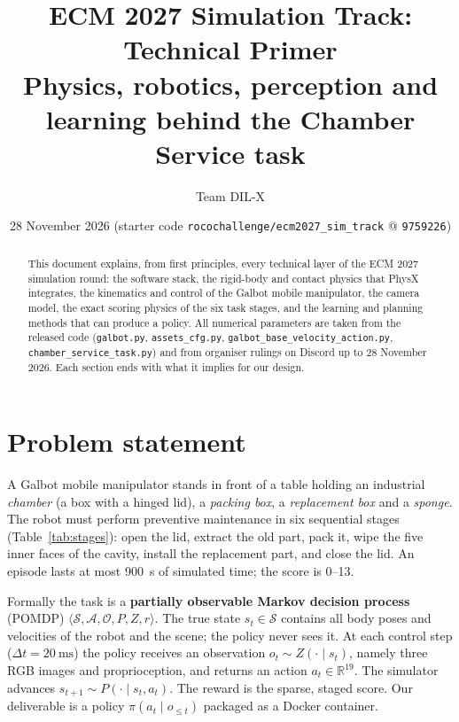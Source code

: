\documentclass[10pt,a4paper]{article}
\title{\textbf{ECM 2027 Simulation Track: Technical Primer}\\[2pt]
\large Physics, robotics, perception and learning behind the Chamber Service task}
\author{Team DIL-X}
\date{28 November 2026 \quad(starter code \texttt{rocochallenge/ecm2027\_sim\_track} @ \texttt{9759226})}
\newcommand{\R}{\mathbb{R}}
\begin{document}
\maketitle
\vspace{-6pt}
\begin{abstract}
\noindent This document explains, from first principles, every technical layer of the ECM 2027 simulation round: the software stack, the rigid-body and contact physics that PhysX integrates, the kinematics and control of the Galbot mobile manipulator, the camera model, the exact scoring physics of the six task stages, and the learning and planning methods that can produce a policy. All numerical parameters are taken from the released code (\texttt{galbot.py}, \texttt{assets\_cfg.py}, \texttt{galbot\_base\_velocity\_action.py}, \texttt{chamber\_service\_task.py}) and from organiser rulings on Discord up to 28 November 2026. Each section ends with what it implies for our design.
\end{abstract}

\tableofcontents
\newpage

\section{Problem statement}
A Galbot mobile manipulator stands in front of a table holding an industrial \emph{chamber} (a box with a hinged lid), a \emph{packing box}, a \emph{replacement box} and a \emph{sponge}. The robot must perform preventive maintenance in six sequential stages (Table~\ref{tab:stages}): open the lid, extract the old part, pack it, wipe the five inner faces of the cavity, install the replacement part, and close the lid. An episode lasts at most \SI{900}{\second} of simulated time; the score is 0--13.

Formally the task is a \textbf{partially observable Markov decision process} (POMDP) $\langle\mathcal S,\mathcal A,\mathcal O,P,Z,r\rangle$. The true state $s_t\in\mathcal S$ contains all body poses and velocities of the robot and the scene; the policy never sees it. At each control step ($\Delta t=\SI{20}{\milli\second}$) the policy receives an observation $o_t\sim Z(\cdot\mid s_t)$, namely three RGB images and proprioception, and returns an action $a_t\in\R^{19}$. The simulator advances $s_{t+1}\sim P(\cdot\mid s_t,a_t)$. The reward is the sparse, staged score. Our deliverable is a policy $\pi(a_t\mid o_{\le t})$ packaged as a Docker container.
\end{document}
